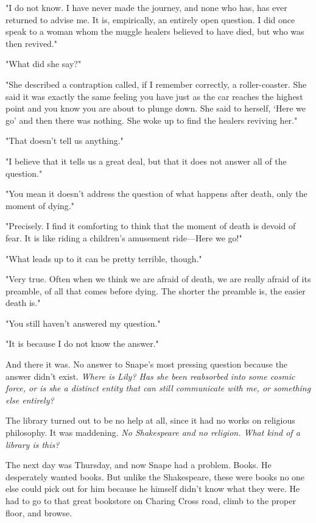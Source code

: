 "I do not know. I have never made the journey, and none who has, has ever returned to advise me. It is, empirically, an entirely open question. I did once speak to a woman whom the muggle healers believed to have died, but who was then revived."

"What did she say?"

"She described a contraption called, if I remember correctly, a roller-coaster. She said it was exactly the same feeling you have just as the car reaches the highest point and you know you are about to plunge down. She said to herself, `Here we go{\el}' and then there was nothing. She woke up to find the healers reviving her."

"That doesn't tell us anything."

"I believe that it tells us a great deal, but that it does not answer all of the question."

"You mean it doesn't address the question of what happens after death, only the moment of dying."

"Precisely. I find it comforting to think that the moment of death is devoid of fear. It is like riding a children's amusement ride—Here we go!"

"What leads up to it can be pretty terrible, though."

"Very true. Often when we think we are afraid of death, we are really afraid of its preamble, of all that comes before dying. The shorter the preamble is, the easier death is."

"You still haven't answered my question."

"It is because I do not know the answer."

And there it was. No answer to Snape's most pressing question because the answer didn't exist. \emph{Where is Lily? Has she been reabsorbed into some cosmic force, or is she a distinct entity that can still communicate with me, or something else entirely?}

The library turned out to be no help at all, since it had no works on religious philosophy. It was maddening. \emph{No Shakespeare and no religion. What kind of a library is this?}

The next day was Thursday, and now Snape had a problem. Books. He desperately wanted books. But unlike the Shakespeare, these were books no one else could pick out for him because he himself didn't know what they were. He had to go to that great bookstore on Charing Cross road, climb to the proper floor, and browse.

